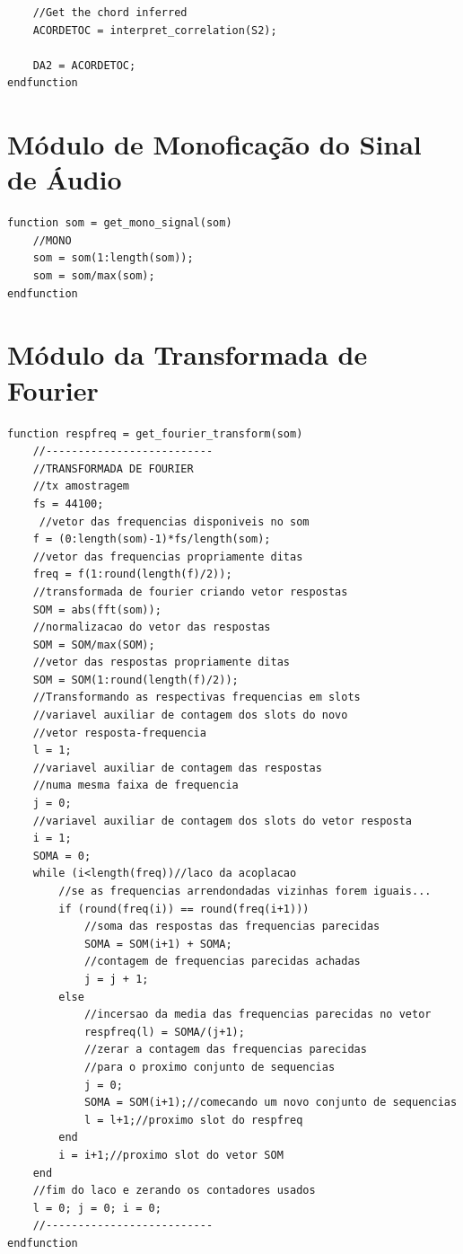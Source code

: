 \begin{apendicesenv}
\begin{lstlisting}
	//Get the chord inferred
	ACORDETOC = interpret_correlation(S2);

	DA2 = ACORDETOC;
endfunction
\end{lstlisting}

\section{Módulo de Monoficação do Sinal de Áudio}
\label{sec:modulomonoficacao}
\begin{lstlisting} 
function som = get_mono_signal(som)
	//MONO
	som = som(1:length(som));
	som = som/max(som);
endfunction
\end{lstlisting}

\section{Módulo da Transformada de Fourier}
\label{sec:modulotransformadafourier}
\begin{lstlisting} 
function respfreq = get_fourier_transform(som)
    //--------------------------
    //TRANSFORMADA DE FOURIER
    //tx amostragem
    fs = 44100; 
     //vetor das frequencias disponiveis no som
    f = (0:length(som)-1)*fs/length(som);
    //vetor das frequencias propriamente ditas
    freq = f(1:round(length(f)/2)); 
    //transformada de fourier criando vetor respostas
    SOM = abs(fft(som));
    //normalizacao do vetor das respostas 
    SOM = SOM/max(SOM); 
    //vetor das respostas propriamente ditas
    SOM = SOM(1:round(length(f)/2)); 
    //Transformando as respectivas frequencias em slots
    //variavel auxiliar de contagem dos slots do novo 
    //vetor resposta-frequencia
    l = 1; 
    //variavel auxiliar de contagem das respostas 
    //numa mesma faixa de frequencia
    j = 0; 
    //variavel auxiliar de contagem dos slots do vetor resposta
    i = 1; 
    SOMA = 0; 
    while (i<length(freq))//laco da acoplacao
    	//se as frequencias arrendondadas vizinhas forem iguais...
        if (round(freq(i)) == round(freq(i+1)))
        	//soma das respostas das frequencias parecidas
            SOMA = SOM(i+1) + SOMA;
            //contagem de frequencias parecidas achadas
            j = j + 1;
        else
        	//incersao da media das frequencias parecidas no vetor 
            respfreq(l) = SOMA/(j+1);
            //zerar a contagem das frequencias parecidas 
            //para o proximo conjunto de sequencias
            j = 0;
            SOMA = SOM(i+1);//comecando um novo conjunto de sequencias
            l = l+1;//proximo slot do respfreq
        end
        i = i+1;//proximo slot do vetor SOM   
    end
    //fim do laco e zerando os contadores usados
    l = 0; j = 0; i = 0;
    //--------------------------
endfunction
\end{lstlisting}


\end{apendicesenv}
